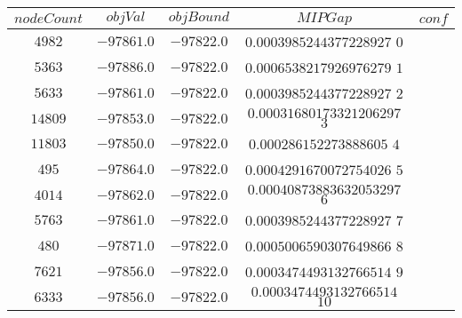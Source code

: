 \begin{center}
\begin{tabular}{|c|c|c|c|c|}
\hline
$nodeCount$ & $objVal$ & $objBound$ & $MIPGap$ & $conf$\\\hline
$4982$ & $-97861.0$ & $-97822.0$ & $0.0003985244377228927$ $0$ \\\hline
$5363$ & $-97886.0$ & $-97822.0$ & $0.0006538217926976279$ $1$ \\\hline
$5633$ & $-97861.0$ & $-97822.0$ & $0.0003985244377228927$ $2$ \\\hline
$14809$ & $-97853.0$ & $-97822.0$ & $0.00031680173321206297$ $3$ \\\hline
$11803$ & $-97850.0$ & $-97822.0$ & $0.000286152273888605$ $4$ \\\hline
$495$ & $-97864.0$ & $-97822.0$ & $0.0004291670072754026$ $5$ \\\hline
$4014$ & $-97862.0$ & $-97822.0$ & $0.00040873883632053297$ $6$ \\\hline
$5763$ & $-97861.0$ & $-97822.0$ & $0.0003985244377228927$ $7$ \\\hline
$480$ & $-97871.0$ & $-97822.0$ & $0.0005006590307649866$ $8$ \\\hline
$7621$ & $-97856.0$ & $-97822.0$ & $0.0003474493132766514$ $9$ \\\hline
$6333$ & $-97856.0$ & $-97822.0$ & $0.0003474493132766514$ $10$ \\\hline
\end{tabular}
\end{center}